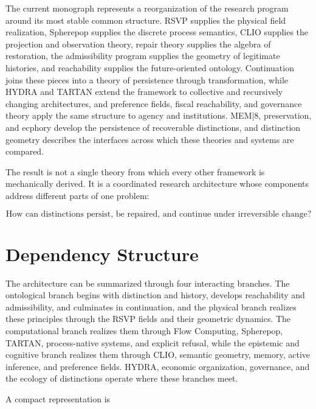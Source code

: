 \documentclass[11pt,oneside]{book}
\numberwithin{equation}{chapter}
\theoremstyle{definition}
\theoremstyle{plain}
\begin{document}
The current monograph represents a reorganization of the research program around its most stable common structure. RSVP supplies the physical field realization, Spherepop supplies the discrete process semantics, CLIO supplies the projection and observation theory, repair theory supplies the algebra of restoration, the admissibility program supplies the geometry of legitimate histories, and reachability supplies the future-oriented ontology. Continuation joins these pieces into a theory of persistence through transformation, while HYDRA and TARTAN extend the framework to collective and recursively changing architectures, and preference fields, fiscal reachability, and governance theory apply the same structure to agency and institutions. MEM|8, preservation, and ecphory develop the persistence of recoverable distinctions, and distinction geometry describes the interfaces across which these theories and systems are compared.

The result is not a single theory from which every other framework is
mechanically derived. It is a coordinated research architecture whose
components address different parts of one problem:

\[
\boxed{
\text{How can distinctions persist, be repaired, and continue under
irreversible change?}
}
\]

\section{Dependency Structure}

The architecture can be summarized through four interacting branches. The ontological branch begins with distinction and history, develops reachability and admissibility, and culminates in continuation, and the physical branch realizes these principles through the RSVP fields and their geometric dynamics. The computational branch realizes them through Flow Computing, Spherepop, TARTAN, process-native systems, and explicit refusal, while the epistemic and cognitive branch realizes them through CLIO, semantic geometry, memory, active inference, and preference fields. HYDRA, economic organization, governance, and the ecology of distinctions operate where these branches meet.

A compact representation is
\end{document}
